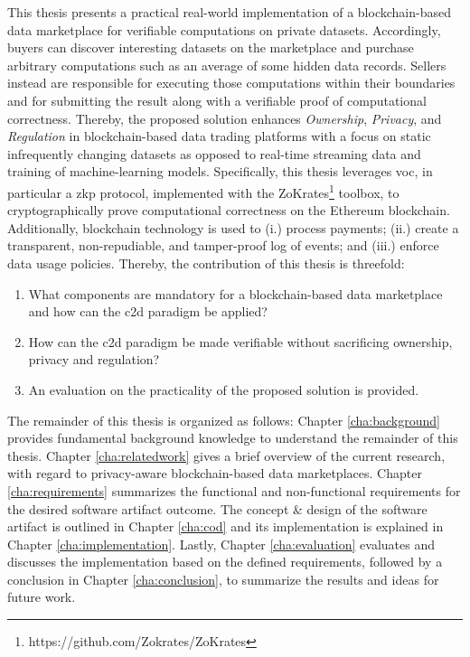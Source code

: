 
This thesis presents a practical real-world implementation of a blockchain-based data marketplace for verifiable computations on private datasets. Accordingly, buyers can discover interesting datasets on the marketplace and purchase arbitrary computations such as an average of some hidden data records. Sellers instead are responsible for executing those computations within their boundaries and for submitting the result along with a verifiable proof of computational correctness. Thereby, the proposed solution enhances \emph{Ownership}, \emph{Privacy}, and \emph{Regulation} in blockchain-based data trading platforms with a focus on static infrequently changing datasets as opposed to real-time streaming data and training of machine-learning models. Specifically, this thesis leverages \acrshort{voc}, in particular a \acrfull{zkp} protocol, implemented with the ZoKrates\footnote{https://github.com/Zokrates/ZoKrates} toolbox, to cryptographically prove computational correctness on the Ethereum blockchain. Additionally, blockchain technology is used to (i.) process payments; (ii.) create a transparent, non-repudiable, and tamper-proof log of events; and (iii.) enforce data usage policies. Thereby, the contribution of this thesis is threefold:

\begin{enumerate}
    \item What components are mandatory for a blockchain-based data marketplace and how can the \acrlong{c2d} paradigm be applied?
    \item How can the \acrlong{c2d} paradigm be made verifiable without sacrificing ownership, privacy and regulation?
    \item An evaluation on the practicality of the proposed solution is provided.
\end{enumerate}

The remainder of this thesis is organized as follows: Chapter \ref{cha:background} provides fundamental background knowledge to understand the remainder of this thesis. Chapter \ref{cha:relatedwork} gives a brief overview of the current research, with regard to privacy-aware blockchain-based data marketplaces. Chapter \ref{cha:requirements} summarizes the functional and non-functional requirements for the desired software artifact outcome. The concept \& design of the software artifact is outlined in Chapter \ref{cha:cod} and its implementation is explained in Chapter \ref{cha:implementation}. Lastly, Chapter \ref{cha:evaluation} evaluates and discusses the implementation based on the defined requirements, followed by a conclusion in Chapter \ref{cha:conclusion}, to summarize the results and ideas for future work.


